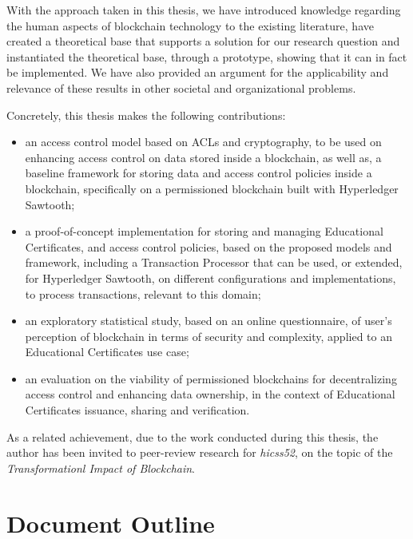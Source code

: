 With the approach taken in this thesis, we have introduced knowledge regarding the human aspects of blockchain technology to the existing literature, have created a theoretical base that supports a solution for our research question and instantiated the theoretical base, through a prototype, showing that it can in fact be implemented. We have also provided an argument for the applicability and relevance of these results in other societal and organizational problems.

Concretely, this thesis makes the following contributions:

\begin{itemize}
	\item an access control model based on ACLs and cryptography, to be used on enhancing access control on data stored inside a blockchain, as well as, a baseline framework for storing data and access control policies inside a blockchain, specifically on a permissioned blockchain built with Hyperledger Sawtooth;
	\item a proof-of-concept implementation for storing and managing Educational Certificates, and access control policies, based on the proposed models and framework, including a Transaction Processor that can be used, or extended, for Hyperledger Sawtooth, on different configurations and implementations, to process transactions, relevant to this domain;
	\item an exploratory statistical study, based on an online questionnaire, of user's perception of blockchain in terms of security and complexity, applied to an Educational Certificates use case;
	\item an evaluation on the viability of permissioned blockchains for decentralizing access control and enhancing data ownership, in the context of Educational Certificates issuance, sharing and verification.
\end{itemize}

As a related achievement, due to the work conducted during this thesis, the author has been invited to peer-review research for \textit{\glsdesc{hicss52}}, on the topic of the \textit{Transformationl Impact of Blockchain}.

\section{Document Outline}

